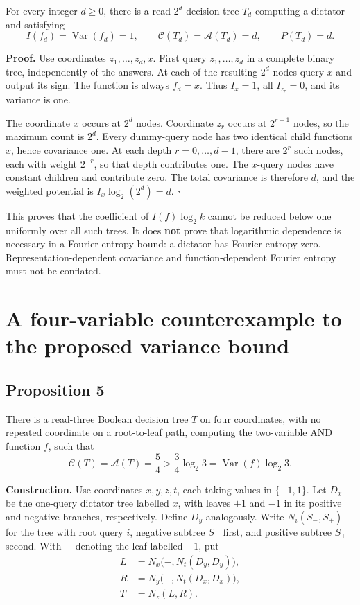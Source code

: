 \documentclass[
  american,
  11pt,
]{article}
\begin{document}
For every integer \(d\geq0\), there is a read-\(2^d\) decision tree
\(T_d\) computing a dictator and satisfying \[
I(f_d)=\operatorname{Var}(f_d)=1,\qquad
\mathcal C(T_d)=\mathcal A(T_d)=d,\qquad
P(T_d)=d.
\tag{12}
\]

\textbf{Proof.} Use coordinates \(z_1,\ldots,z_d,x\). First query
\(z_1,\ldots,z_d\) in a complete binary tree, independently of the
answers. At each of the resulting \(2^d\) nodes query \(x\) and output
its sign. The function is always \(f_d=x\). Thus \(I_x=1\), all
\(I_{z_r}=0\), and its variance is one.

The coordinate \(x\) occurs at \(2^d\) nodes. Coordinate \(z_r\) occurs
at \(2^{r-1}\) nodes, so the maximum count is \(2^d\). Every dummy-query
node has two identical child functions \(x\), hence covariance one. At
each depth \(r=0,\ldots,d-1\), there are \(2^r\) such nodes, each with
weight \(2^{-r}\), so that depth contributes one. The \(x\)-query nodes
have constant children and contribute zero. The total covariance is
therefore \(d\), and the weighted potential is \(I_x\log_2(2^d)=d\).
\(\square\)

This proves that the coefficient of \(I(f)\log_2k\) cannot be reduced
below one uniformly over all such trees. It does \textbf{not} prove that
logarithmic dependence is necessary in a Fourier entropy bound: a
dictator has Fourier entropy zero. Representation-dependent covariance
and function-dependent Fourier entropy must not be conflated.

\section{A four-variable counterexample to the proposed variance
bound}\label{a-four-variable-counterexample-to-the-proposed-variance-bound}

\subsection*{Proposition 5}\label{proposition-5}

There is a read-three Boolean decision tree \(T\) on four coordinates,
with no repeated coordinate on a root-to-leaf path, computing the
two-variable AND function \(f\), such that \[
\mathcal C(T)=\mathcal A(T)=\frac54
>\frac34\log_2 3
=\operatorname{Var}(f)\log_2 3.
\tag{13}
\]

\textbf{Construction.} Use coordinates \(x,y,z,t\), each taking values
in \(\{-1,1\}\). Let \(D_x\) be the one-query dictator tree labelled
\(x\), with leaves \(+1\) and \(-1\) in its positive and negative
branches, respectively. Define \(D_y\) analogously. Write
\(N_i(S_-,S_+)\) for the tree with root query \(i\), negative subtree
\(S_-\) first, and positive subtree \(S_+\) second. With \(-\) denoting
the leaf labelled \(-1\), put \[
\begin{aligned}
L&=N_x\bigl(-,N_t(D_y,D_y)\bigr),\\
R&=N_y\bigl(-,N_t(D_x,D_x)\bigr),\\
T&=N_z(L,R).
\end{aligned}
\tag{14}
\]
\end{document}
